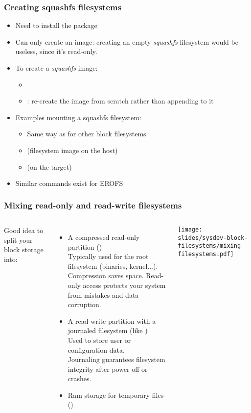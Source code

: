 \begin{frame}
  \frametitle{Creating squashfs filesystems}
  \begin{itemize}
  \item Need to install the  package
  \item Can only create an image: creating an empty {\em squashfs}
    filesystem would be useless, since it's read-only.
  \item To create a {\em squashfs} image:
    \begin{itemize}
    \item {}
    \item {}: re-create the image from scratch rather
      than appending to it
    \end{itemize}
  \item Examples mounting a squashfs filesystem:
    \begin{itemize}
    \item Same way as for other block filesystems
    \item {} (filesystem image on the host)
    \item {} (on the target)
    \end{itemize}
  \item Similar commands exist for EROFS
  \end{itemize}
\end{frame}

\begin{frame}
  \frametitle{Mixing read-only and read-write filesystems}
  \begin{columns}
    Good idea to split your block storage into:
    \begin{itemize}
    \item A compressed read-only partition ()\\
      Typically used for the root filesystem (binaries, kernel...).\\
      Compression saves space. Read-only access protects your system
      from mistakes and data corruption.
    \item A read-write partition with a journaled filesystem (like )\\
      Used to store user or configuration data.\\
      Journaling guarantees filesystem integrity after power off or crashes.
    \item Ram storage for temporary files ()
    \end{itemize}
    \texttt{[image: slides/sysdev-block-filesystems/mixing-filesystems.pdf]}
  \end{columns}
\end{frame}

